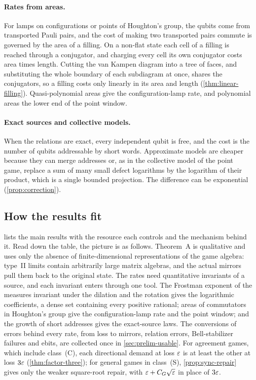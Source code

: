 \paragraph{Rates from areas.} For lamps on configurations or points of Houghton's group, the qubits come from transported Pauli
pairs, and the cost of making two transported pairs commute is governed by the area of a filling. On a non-flat state each cell of
a filling is reached through a conjugator, and charging every cell its own conjugator costs area times length. Cutting the van
Kampen diagram into a tree of faces, and substituting the whole boundary of each subdiagram at once, shares the conjugators, so a
filling costs only linearly in its area and length (\cref{thm:linear-filling}). Quasi-polynomial areas give the
configuration-lamp rate, and polynomial areas the lower end of the point window.

\paragraph{Exact sources and collective models.} When the relations are exact, every independent qubit is free, and the cost is the
number of qubits addressable by short words. Approximate models are cheaper because they can merge addresses or, as in the
collective model of the point game, replace a sum of many small defect logarithms by the logarithm of their product, which is a
single bounded projection. The difference can be exponential (\cref{prop:correction}).

\subsection{How the results fit}\label{sec:intro-map}

 lists the main results with the resource each controls and the mechanism behind it. Read down the table, the
picture is as follows. Theorem~A is qualitative and uses only the absence of finite-dimensional representations of the game
algebra: type~II limits contain arbitrarily large matrix algebras, and the actual mirrors pull them back to the original state. The
rates need quantitative invariants of a source, and each invariant enters through one tool. The Frostman exponent of the
measures invariant under the dilation and the rotation gives the logarithmic coefficients, a dense set containing every positive
rational; areas of commutators in Houghton's group give the configuration-lamp rate and
the point window; and the growth of short addresses gives the exact-source laws. The conversions of errors behind every rate,
from loss to mirrors, relation errors, Bell-stabilizer failures and ebits, are collected once in \cref{sec:prelim-usable}. For
agreement games, which include class~(C), each directional demand at loss $\varepsilon$ is at least the other at loss $3\varepsilon$
(\cref{thm:factor-three}); for general games in class~(S), \cref{prop:sync-repair} gives only the weaker square-root repair, with
$\varepsilon+C_G\sqrt{\varepsilon}$ in place of $3\varepsilon$.

